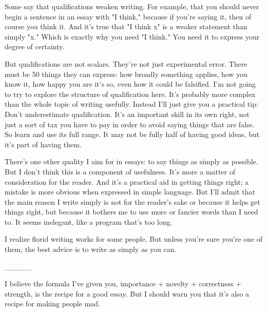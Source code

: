 Some say
                  that qualifications weaken writing. For example, that you
                  should never begin a sentence in an essay with "I think,"
                  because if you're saying it, then of course you think it. And
                  it's true that "I think x" is a weaker statement than simply
                  "x." Which is exactly why you need "I think." You need it to
                  express your degree of certainty.

But
                  qualifications are not scalars. They're not just experimental
                  error. There must be 50 things they can express: how broadly
                  something applies, how you know it, how happy you are it's so,
                  even how it could be falsified. I'm not going to try to
                  explore the structure of qualification here. It's probably
                  more complex than the whole topic of writing usefully. Instead
                  I'll just give you a practical tip: Don't underestimate
                  qualification. It's an important skill in its own right, not
                  just a sort of tax you have to pay in order to avoid saying
                  things that are false. So learn and use its full range. It may
                  not be fully half of having good ideas, but it's part of
                  having them.

There's one other quality I aim for in
                  essays: to say things as simply as possible. But I don't think
                  this is a component of usefulness. It's more a matter of
                  consideration for the reader. And it's a practical aid in
                  getting things right; a mistake is more obvious when expressed
                  in simple language. But I'll admit that the main reason I
                  write simply is not for the reader's sake or because it helps
                  get things right, but because it bothers me to use more or
                  fancier words than I need to. It seems inelegant, like a
                  program that's too long.

I realize florid writing
                  works for some people. But unless you're sure you're one of
                  them, the best advice is to write as simply as you can.


                  \_\_\_\_\_
                  


                  I believe the formula I've given you, importance + novelty +
                  correctness + strength, is the recipe for a good essay. But I
                  should warn you that it's also a recipe for making people
                  mad.

